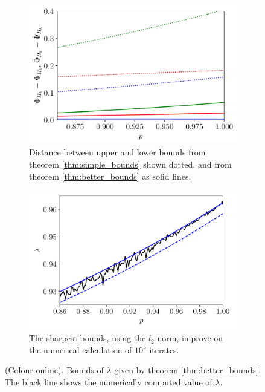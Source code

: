 \documentclass{iopart}
\begin{document}
\begin{figure}
     \centering
     \begin{subfigure}[b]{0.49\textwidth}
         \centering
         \includegraphics[width=\textwidth]{ltm_better_bounds.pdf}
         \caption{Distance between upper and lower bounds from theorem \ref{thm:simple_bounds} shown dotted, and from theorem \ref{thm:better_bounds} as solid lines.}
         \label{fig:better_bounds}
     \end{subfigure}
     \hfill
     \begin{subfigure}[b]{0.49\textwidth}
         \centering
         \includegraphics[width=\textwidth]{ltm_better_bounds_zoom.pdf}
         \caption{The sharpest bounds, using the $l_2$ norm, improve on the numerical calculation of $10^5$ iterates.}
         \label{fig:better_bounds_zoom}
     \end{subfigure}
        \caption{(Colour online). Bounds of $\lambda$ given by theorem \ref{thm:better_bounds}. The black line shows the numerically computed value of $\lambda$.}
        \label{fig:better}
\end{figure}
\end{document}

